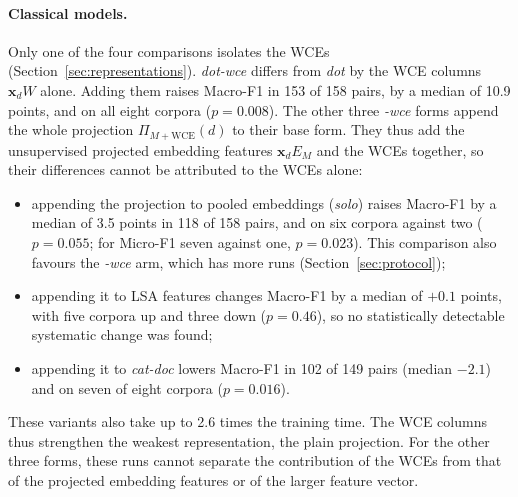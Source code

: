 \documentclass{ijis}
\begin{document}
\paragraph{Classical models.} Only one of the four comparisons isolates the WCEs (Section~\ref{sec:representations}). \emph{dot-wce} differs from \emph{dot} by the WCE columns $\mathbf{x}_d W$ alone. Adding them raises Macro-F1 in 153 of 158 pairs, by a median of 10.9 points, and on all eight corpora ($p = 0.008$). The other three \emph{-wce} forms append the whole projection $\Pi_{M+\mathrm{WCE}}(d)$ to their base form. They thus add the unsupervised projected embedding features $\mathbf{x}_d E_M$ and the WCEs together, so their differences cannot be attributed to the WCEs alone:
\begin{itemize}
\setlength\itemsep{1pt}
\item appending the projection to pooled embeddings (\emph{solo}) raises Macro-F1 by a median of 3.5 points in 118 of 158 pairs, and on six corpora against two ($p = 0.055$; for Micro-F1 seven against one, $p = 0.023$). This comparison also favours the \emph{-wce} arm, which has more runs (Section~\ref{sec:protocol});
\item appending it to LSA features changes Macro-F1 by a median of $+0.1$ points, with five corpora up and three down ($p = 0.46$), so no statistically detectable systematic change was found;
\item appending it to \emph{cat-doc} lowers Macro-F1 in 102 of 149 pairs (median $-2.1$) and on seven of eight corpora ($p = 0.016$).
\end{itemize}
These variants also take up to 2.6 times the training time. The WCE columns thus strengthen the weakest representation, the plain projection. For the other three forms, these runs cannot separate the contribution of the WCEs from that of the projected embedding features or of the larger feature vector.
\end{document}
